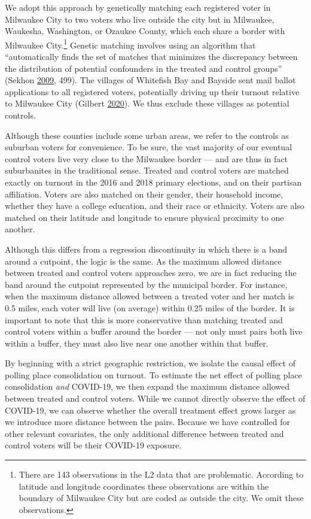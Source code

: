 \documentclass[
  12pt,
]{article}
\begin{document}
We adopt this approach by genetically matching each registered voter in Milwaukee City to two voters who live outside the city but in Milwaukee, Waukesha, Washington, or Ozaukee County, which each share a border with Milwaukee City.\footnote{There are 143 observations in the L2 data that are problematic. According to latitude and longitude coordinates these observations are within the boundary of Milwaukee City but are coded as outside the city. We omit these observations.} Genetic matching involves using an algorithm that ``automatically finds the set of matches that minimizes the discrepancy between the distribution of potential confounders in the treated and control groups'' (Sekhon \protect\hyperlink{ref-Sekhon2009}{2009}, 499). The villages of Whitefish Bay and Bayside sent mail ballot applications to all registered voters, potentially driving up their turnout relative to Milwaukee City (Gilbert \protect\hyperlink{ref-Gilbert2020}{2020}). We thus exclude these villages as potential controls.

Although these counties include some urban areas, we refer to the controls as suburban voters for convenience. To be sure, the vast majority of our eventual control voters live very close to the Milwaukee border --- and are thus in fact suburbanites in the traditional sense. Treated and control voters are matched exactly on turnout in the 2016 and 2018 primary elections, and on their partisan affiliation. Voters are also matched on their gender, their household income, whether they have a college education, and their race or ethnicity. Voters are also matched on their latitude and longitude to ensure physical proximity to one another.

Although this differs from a regression discontinuity in which there is a band around a cutpoint, the logic is the same. As the maximum allowed distance between treated and control voters approaches zero, we are in fact reducing the band around the cutpoint represented by the municipal border. For instance, when the maximum distance allowed between a treated voter and her match is 0.5 miles, each voter will live (on average) within 0.25 miles of the border. It is important to note that this is more conservative than matching treated and control voters within a buffer around the border --- not only must pairs both live within a buffer, they must also live near one another within that buffer.

By beginning with a strict geographic restriction, we isolate the causal effect of polling place consolidation on turnout. To estimate the net effect of polling place consolidation \emph{and} COVID-19, we then expand the maximum distance allowed between treated and control voters. While we cannot directly observe the effect of COVID-19, we can observe whether the overall treatment effect grows larger as we introduce more distance between the pairs. Because we have controlled for other relevant covariates, the only additional difference between treated and control voters will be their COVID-19 exposure.
\end{document}

